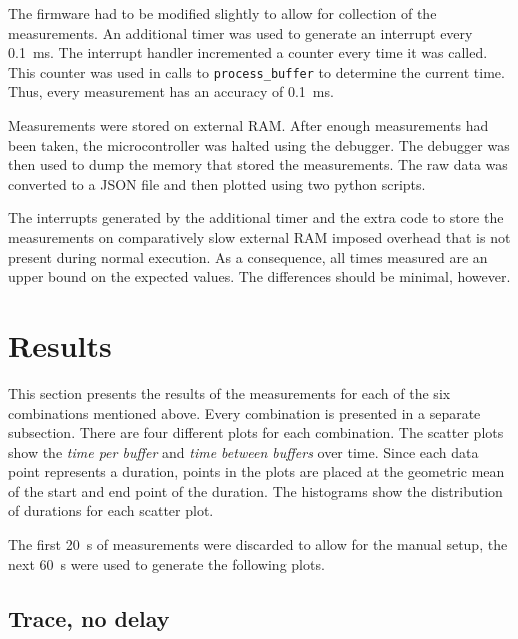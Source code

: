 The firmware had to be modified slightly to allow for collection of the measurements. An additional
timer was used to generate an interrupt every \SI{0.1}{\milli\second}. The interrupt handler incremented
a counter every time it was called. This counter was used in calls to \lstinline{process_buffer} to
determine the current time. Thus, every measurement has an accuracy of \SI{0.1}{\milli\second}.

Measurements were stored on external RAM. After enough measurements had been taken, the microcontroller
was halted using the debugger. The debugger was then used to dump the memory that stored the
measurements. The raw data was converted to a JSON file and then plotted using two python scripts.

The interrupts generated by the additional timer and the extra code to store the measurements on
comparatively slow external RAM imposed overhead that is not present during normal execution. As a
consequence, all times measured are an upper bound on the expected values. The differences should be
minimal, however.

\section{Results}
\label{evaluation/results}

This section presents the results of the measurements for each of the six combinations mentioned
above. Every combination is presented in a separate subsection. There are four different plots
for each combination. The scatter plots show the \textit{time per buffer} and
\textit{time between buffers} over time. Since each data point represents a duration, points in the
plots are placed at the geometric mean of the start and end point of the duration. The histograms
show the distribution of durations for each scatter plot.

The first \SI{20}{\second} of measurements were discarded to allow for the manual setup, the next
\SI{60}{\second} were used to generate the following plots.


\subsection{Trace, no delay}
\label{evaluation/results/trace-no-delay}

